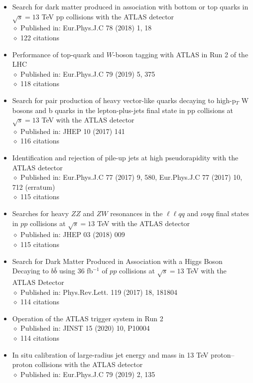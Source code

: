 \documentclass[margin, 10pt]{res} %
\begin{document}
\begin{resume}
\begin{itemize}
\item Search for dark matter produced in association with bottom or top quarks in $\sqrt{s} = 13$ TeV pp collisions with the ATLAS detector\\
$\diamond$ Published in: Eur.Phys.J.C 78 (2018) 1, 18\\
$\diamond$ 122 citations
\item Performance of top-quark and $W$-boson tagging with ATLAS in Run 2 of the LHC\\
$\diamond$ Published in: Eur.Phys.J.C 79 (2019) 5, 375\\
$\diamond$ 118 citations
\item Search for pair production of heavy vector-like quarks decaying to high-p$_{T}$ W bosons and b quarks in the lepton-plus-jets final state in pp collisions at $\sqrt{s} = 13$ TeV with the ATLAS detector\\
$\diamond$ Published in: JHEP 10 (2017) 141\\
$\diamond$ 116 citations
\item Identification and rejection of pile-up jets at high pseudorapidity with the ATLAS detector\\
$\diamond$ Published in: Eur.Phys.J.C 77 (2017) 9, 580, Eur.Phys.J.C 77 (2017) 10, 712 (erratum)\\
$\diamond$ 115 citations
\item Searches for heavy $ZZ$ and $ZW$ resonances in the $\ell\ell qq$ and $\nu\nu qq$ final states in $pp$ collisions at $\sqrt{s} = 13$ TeV with the ATLAS detector\\
$\diamond$ Published in: JHEP 03 (2018) 009\\
$\diamond$ 115 citations
\item Search for Dark Matter Produced in Association with a Higgs Boson Decaying to $b\bar{b}$ using 36 fb$^{-1}$ of $pp$ collisions at $\sqrt{s} = 13$ TeV with the ATLAS Detector\\
$\diamond$ Published in: Phys.Rev.Lett. 119 (2017) 18, 181804\\
$\diamond$ 114 citations
\item Operation of the ATLAS trigger system in Run 2\\
$\diamond$ Published in: JINST 15 (2020) 10, P10004\\
$\diamond$ 114 citations
\item In situ calibration of large-radius jet energy and mass in 13 TeV proton–proton collisions with the ATLAS detector\\
$\diamond$ Published in: Eur.Phys.J.C 79 (2019) 2, 135\\

\end{itemize}
\end{resume}
\end{document}

